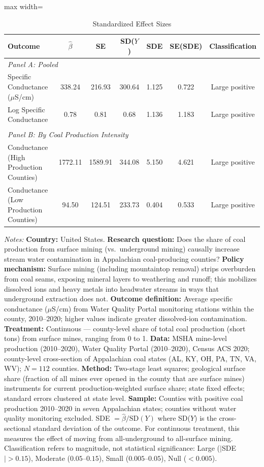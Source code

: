 \begin{table}[t]
\centering
\footnotesize
\caption{Standardized Effect Sizes}
\label{tab:sde}
\begin{adjustbox}{max width=\textwidth}
\begin{tabular}{lcccccc}
\hline\hline
Outcome & $\hat{\beta}$ & SE & SD($Y$) & SDE & SE(SDE) & Classification \\
\hline
\multicolumn{7}{l}{\textit{Panel A: Pooled}} \\
Specific Conductance ($\mu$S/cm) & 338.24 & 216.93 & 300.64 & 1.125 & 0.722 & Large positive \\
Log Specific Conductance & 0.78 & 0.81 & 0.68 & 1.136 & 1.183 & Large positive \\
\\[-1.0ex]
\multicolumn{7}{l}{\textit{Panel B: By Coal Production Intensity}} \\
Conductance (High Production Counties) & 1772.11 & 1589.91 & 344.08 & 5.150 & 4.621 & Large positive \\
Conductance (Low Production Counties) & 94.50 & 124.51 & 233.73 & 0.404 & 0.533 & Large positive \\
\hline\hline
\end{tabular}
\end{adjustbox}
\begin{tablenotes}
\item \textit{Notes:} \textbf{Country:} United States. \textbf{Research question:} Does the share of coal production from surface mining (vs.\ underground mining) causally increase stream water contamination in Appalachian coal-producing counties? \textbf{Policy mechanism:} Surface mining (including mountaintop removal) strips overburden from coal seams, exposing mineral layers to weathering and runoff; this mobilizes dissolved ions and heavy metals into headwater streams in ways that underground extraction does not. \textbf{Outcome definition:} Average specific conductance ($\mu$S/cm) from Water Quality Portal monitoring stations within the county, 2010--2020; higher values indicate greater dissolved-ion contamination. \textbf{Treatment:} Continuous --- county-level share of total coal production (short tons) from surface mines, ranging from 0 to 1. \textbf{Data:} MSHA mine-level production (2010--2020), Water Quality Portal (2010--2020), Census ACS 2020; county-level cross-section of Appalachian coal states (AL, KY, OH, PA, TN, VA, WV); $N = 112$ counties. \textbf{Method:} Two-stage least squares; geological surface share (fraction of all mines ever opened in the county that are surface mines) instruments for current production-weighted surface share; state fixed effects; standard errors clustered at state level. \textbf{Sample:} Counties with positive coal production 2010--2020 in seven Appalachian states; counties without water quality monitoring excluded. SDE $= \hat{\beta} / \text{SD}(Y)$ where SD($Y$) is the cross-sectional standard deviation of the outcome. For continuous treatment, this measures the effect of moving from all-underground to all-surface mining. Classification refers to magnitude, not statistical significance: Large ($|$SDE$| > 0.15$), Moderate ($0.05$--$0.15$), Small ($0.005$--$0.05$), Null ($< 0.005$).

\end{tablenotes}
\end{table}
